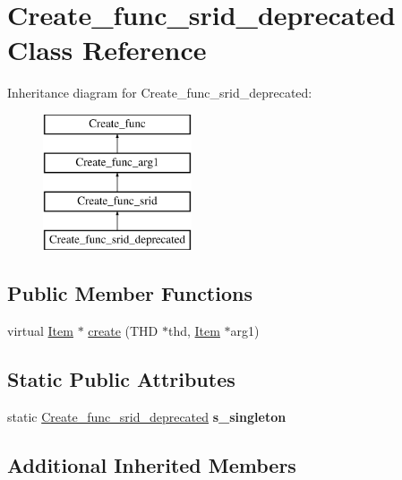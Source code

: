 \hypertarget{classCreate__func__srid__deprecated}{}\section{Create\+\_\+func\+\_\+srid\+\_\+deprecated Class Reference}
\label{classCreate__func__srid__deprecated}
Inheritance diagram for Create\+\_\+func\+\_\+srid\+\_\+deprecated\+:\begin{figure}[H]
\begin{center}
\leavevmode
\includegraphics[height=4.000000cm]{classCreate__func__srid__deprecated}
\end{center}
\end{figure}
\subsection*{Public Member Functions}
\begin{DoxyCompactItemize}
\item 
virtual \mbox{\hyperlink{classItem}{Item}} $\ast$ \mbox{\hyperlink{classCreate__func__srid__deprecated_aab48858db4cb1dc7a693b7f1d18939ac}{create}} (T\+HD $\ast$thd, \mbox{\hyperlink{classItem}{Item}} $\ast$arg1)
\end{DoxyCompactItemize}
\subsection*{Static Public Attributes}
\begin{DoxyCompactItemize}
\item 
\mbox{\label{classCreate__func__srid__deprecated_a77d6d079d5990508b968e154ecd1648f}} 
static \mbox{\hyperlink{classCreate__func__srid__deprecated}{Create\+\_\+func\+\_\+srid\+\_\+deprecated}} {\bfseries s\+\_\+singleton}
\end{DoxyCompactItemize}
\subsection*{Additional Inherited Members}


